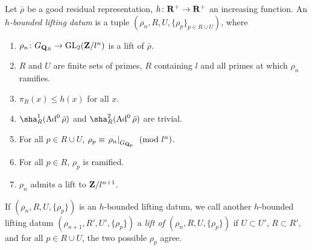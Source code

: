 \begin{definition}
Let $\bar\rho$ be a good residual representation, $h\colon \mathbf{R}^+ \to \mathbf{R}^+$ an 
increasing function. An \emph{$h$-bounded lifting datum} is a tuple 
$(\rho_n,R,U,\{\rho_p\}_{p\in R\cup U})$, where 
\begin{enumerate}
\item
$\rho_n\colon G_{\mathbf{Q}_R} \to \operatorname{GL}_2(\mathbf{Z}/l^n)$ is a lift of $\bar\rho$.

\item
$R$ and $U$ are finite sets of primes, $R$ containing $l$ and all primes at 
which $\rho_n$ ramifies. 

\item
$\pi_R(x)\leqslant h(x)$ for all $x$. 

\item
$\sha_R^1(\Ad^0\bar\rho)$ and $\sha_R^2(\Ad^0\bar\rho)$ are trivial. 

\item
For all $p\in R\cup U$, 
$\rho_p\equiv \left. \rho_n\right|_{G_{\mathbf{Q}_p}}\pmod{l^n}$. 

\item
For all $p\in R$, $\rho_p$ is ramified. 

\item
$\rho_n$ admits a lift to $\mathbf{Z}/l^{n+1}$. 
\end{enumerate}
\end{definition}

If $(\rho_n,R,U,\{\rho_p\})$ is an $h$-bounded lifting datum, we call 
another $h$-bounded lifting datum $(\rho_{n+1},R',U',\{\rho_p\})$ a \emph{lift 
of $(\rho_n,R,U,\{\rho_p\})$} if $U\subset U'$, $R\subset R'$, and for all 
$p\in R\cup U$, the two possible $\rho_p$ agree. 

